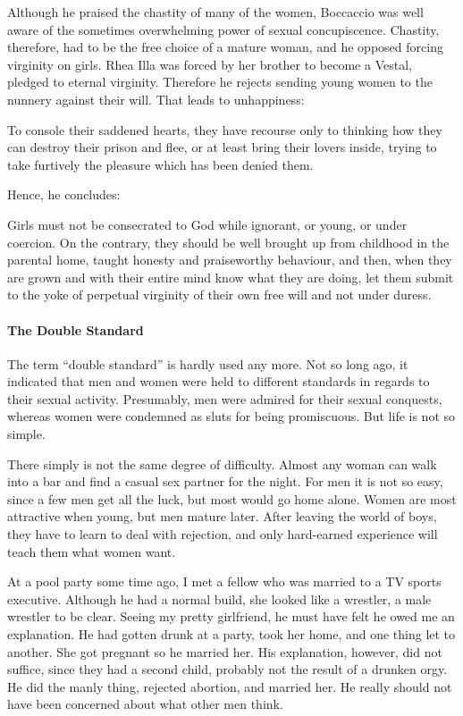 Although he praised the chastity of many of the women, Boccaccio was well aware of the sometimes overwhelming power of sexual concupiscence. Chastity, therefore, had to be the free choice of a mature woman, and he opposed forcing virginity on girls. Rhea Illa was forced by her brother to become a Vestal, pledged to eternal virginity. Therefore he rejects sending young women to the nunnery against their will. That leads to unhappiness:

\begin{quotex}
To console their saddened hearts, they have recourse only to thinking how they can destroy their prison and flee, or at least bring their lovers inside, trying to take furtively the pleasure which has been denied them.
\end{quotex}


Hence, he concludes:

\begin{quotex}
Girls must not be consecrated to God while ignorant, or young, or under coercion. On the contrary, they should be well brought up from childhood in the parental home, taught honesty and praiseworthy behaviour, and then, when they are grown and with their entire mind know what they are doing, let them submit to the yoke of perpetual virginity of their own free will and not under duress.
\end{quotex}


\paragraph{The Double Standard}


The term ``double standard'' is hardly used any more. Not so long ago, it indicated that men and women were held to different standards in regards to their sexual activity. Presumably, men were admired for their sexual conquests, whereas women were condemned as sluts for being promiscuous. But life is not so simple.

There simply is not the same degree of difficulty. Almost any woman can walk into a bar and find a casual sex partner for the night. For men it is not so easy, since a few men get all the luck, but most would go home alone. Women are most attractive when young, but men mature later. After leaving the world of boys, they have to learn to deal with rejection, and only hard-earned experience will teach them what women want.

At a pool party some time ago, I met a fellow who was married to a TV sports executive. Although he had a normal build, she looked like a wrestler, a male wrestler to be clear. Seeing my pretty girlfriend, he must have felt he owed me an explanation. He had gotten drunk at a party, took her home, and one thing let to another. She got pregnant so he married her. His explanation, however, did not suffice, since they had a second child, probably not the result of a drunken orgy. He did the manly thing, rejected abortion, and married her. He really should not have been concerned about what other men think.


